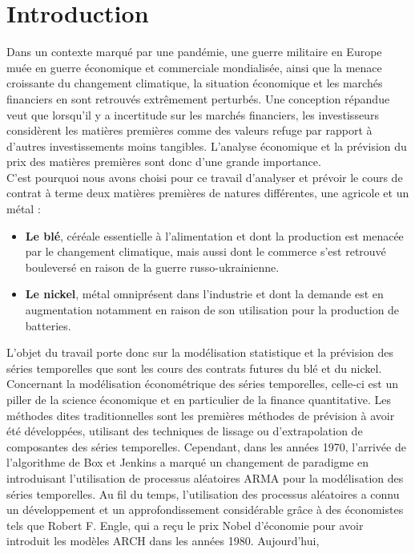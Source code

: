 \section*{Introduction}
Dans un contexte marqué par une pandémie, une guerre militaire en Europe muée en guerre économique et commerciale mondialisée, ainsi que la menace croissante du 
changement climatique, la situation économique et les marchés financiers en sont retrouvés extrêmement perturbés. Une conception répandue
veut que lorsqu'il y a incertitude sur les marchés financiers, les investisseurs considèrent les matières premières comme des valeurs refuge par rapport à d'autres 
investissements moins tangibles. L'analyse économique et la prévision du prix des matières premières sont donc d'une grande importance.\\[5pt] 
C'est pourquoi nous avons choisi pour ce travail d'analyser et prévoir le cours de contrat à terme deux matières premières de natures différentes, une agricole et un métal :
\begin{itemize}
    \item \textbf{Le blé}, céréale essentielle à l'alimentation et dont la production est menacée par le changement climatique, mais aussi dont le commerce s'est retrouvé bouleversé en raison de la guerre russo-ukrainienne.
    \item \textbf{Le nickel}, métal omniprésent dans l'industrie et dont la demande est en augmentation notamment en raison de son utilisation pour la production 
    de batteries.
\end{itemize}
L'objet du travail porte donc sur la modélisation statistique et la prévision des séries temporelles que sont les cours des contrats futures du blé et du nickel. Concernant
la modélisation économétrique des séries temporelles, celle-ci est un piller de la science économique et en particulier de la finance quantitative. Les méthodes dites 
traditionnelles sont les premières méthodes de prévision à avoir été développées, utilisant des techniques de lissage ou d'extrapolation de composantes des séries 
temporelles. Cependant, dans les années 1970, l'arrivée de l'algorithme de Box et Jenkins a marqué un changement de paradigme en introduisant l'utilisation de processus 
aléatoires ARMA pour la modélisation des séries temporelles. Au fil du temps, l'utilisation des processus aléatoires a connu un développement et un approfondissement 
considérable grâce à des économistes tels que Robert F. Engle, qui a reçu le prix Nobel d'économie pour avoir introduit les modèles ARCH dans les années 1980. Aujourd'hui, 

